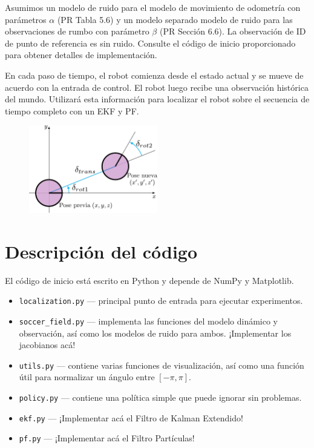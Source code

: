 \documentclass[tp]{lcc}
\begin{document}
	Asumimos un modelo de ruido para el modelo de movimiento de odometría con parámetros $\alpha$ (PR Tabla 5.6) y un modelo separado modelo de ruido para las observaciones de rumbo con parámetro $\beta$ (PR Sección 6.6). La observación de ID de punto de referencia es sin ruido. Consulte el código de inicio proporcionado para obtener detalles de implementación.
	
	En cada paso de tiempo, el robot comienza desde el estado actual y se mueve de acuerdo con la entrada de control. El robot luego recibe una observación histórica del mundo. Utilizará esta información para localizar el robot sobre el
	secuencia de tiempo completo con un EKF y PF.
	
	\begin{figure}[!htbp]
		\centering
		\includegraphics[width=0.5\textwidth]{./images/odometry_as_controls.pdf}
		\label{fig:odometry-base-motion-model}
	\end{figure}

	\section{Descripción del código}
	
	El código de inicio está escrito en Python y depende de NumPy y Matplotlib.
	
	\begin{itemize}
	\item \lstinline[style=bash]{localization.py} --- principal punto de entrada para ejecutar experimentos.
	\item \lstinline[style=bash]{soccer_field.py} --- implementa las funciones del modelo dinámico y observación, así como los modelos de ruido para ambos. ¡Implementar los jacobianos acá!
	\item \lstinline[style=bash]{utils.py} --- contiene varias funciones de visualización, así como una función útil para normalizar un ángulo entre $[-\pi, \pi]$.
	\item \lstinline[style=bash]{policy.py} --- contiene una política simple que puede ignorar sin problemas.
	\item \lstinline[style=bash]{ekf.py} --- ¡Implementar acá el Filtro de Kalman Extendido!
	\item \lstinline[style=bash]{pf.py} --- ¡Implementar acá el Filtro Partículas!
	\end{itemize}
\end{document}
